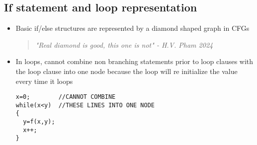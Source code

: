 \documentclass[12pt]{book}
\begin{document}
\subsection{If statement and loop representation}
\begin{itemize}
  \item Basic if/else structures are represented by a diamond shaped graph in CFGs
  \begin{quote}
    \textit{"Real diamond is good, this one is not" - H.V. Pham 2024}
  \end{quote}

  \item In loops, cannot combine non branching statements prior to loop clauses with the loop clause into one node because the loop will re initialize the value every time it loops
  \begin{lstlisting}
x=0;        //CANNOT COMBINE
while(x<y)  //THESE LINES INTO ONE NODE
{
  y=f(x,y);
  x++;
}
  \end{lstlisting}
\end{itemize}
\end{document}
